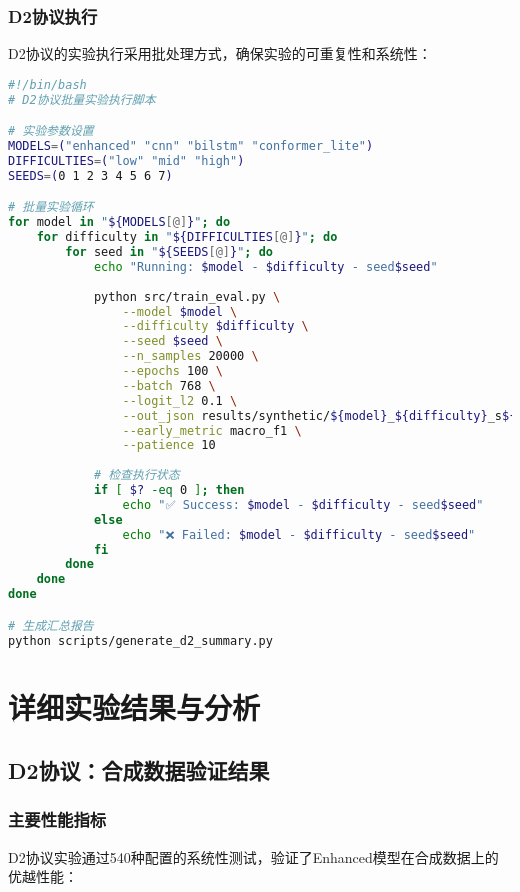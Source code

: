 \subsubsection{D2协议执行}
D2协议的实验执行采用批处理方式，确保实验的可重复性和系统性：

\begin{lstlisting}[language=bash,caption=D2协议批处理脚本]
#!/bin/bash
# D2协议批量实验执行脚本

# 实验参数设置
MODELS=("enhanced" "cnn" "bilstm" "conformer_lite")
DIFFICULTIES=("low" "mid" "high")
SEEDS=(0 1 2 3 4 5 6 7)

# 批量实验循环
for model in "${MODELS[@]}"; do
    for difficulty in "${DIFFICULTIES[@]}"; do
        for seed in "${SEEDS[@]}"; do
            echo "Running: $model - $difficulty - seed$seed"
            
            python src/train_eval.py \
                --model $model \
                --difficulty $difficulty \
                --seed $seed \
                --n_samples 20000 \
                --epochs 100 \
                --batch 768 \
                --logit_l2 0.1 \
                --out_json results/synthetic/${model}_${difficulty}_s${seed}.json \
                --early_metric macro_f1 \
                --patience 10
                
            # 检查执行状态
            if [ $? -eq 0 ]; then
                echo "✅ Success: $model - $difficulty - seed$seed"
            else
                echo "❌ Failed: $model - $difficulty - seed$seed"
            fi
        done
    done
done

# 生成汇总报告
python scripts/generate_d2_summary.py
\end{lstlisting}

\section{详细实验结果与分析}
\label{sec:detailed_results}

\subsection{D2协议：合成数据验证结果}
\label{subsec:d2_results}

\subsubsection{主要性能指标}
D2协议实验通过540种配置的系统性测试，验证了Enhanced模型在合成数据上的优越性能：

